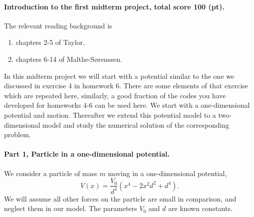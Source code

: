 \documentclass[%
oneside,                 %
final,                   %
10pt]{article}
\begin{document}
\noindent
\paragraph{Introduction to the first midterm project, total score 100 (pt).}
The relevant reading background is
\begin{enumerate}
\item chapters 2-5 of Taylor.

\item chapters 6-14 of Malthe-Sørenssen.
\end{enumerate}

\noindent
In this midterm project we will start with a potential similar to the
one we discussed in exercise 4 in homework 6. There are some elements
of that exercise which are repeated here, similarly, a good fraction
of the codes you have developed for homeworks 4-6 can be used here.
We start with a one-dimensional potential and motion.  Thereafter we
extend this potential model to a two-dimensional model and study the
numerical solution of the corresponding problem.

\paragraph{Part 1, Particle in a one-dimensional  potential.}
We consider a particle of mass $m$ moving in a one-dimensional potential,
\[
V(x)=\frac{V_0}{d^4}\left(x^4-2x^2d^2+d^4\right).
\]
We will assume all other forces on the particle are small in comparison, and neglect them in our model.  The parameters $V_0$ and $d$ are known constants. 
\end{document}

